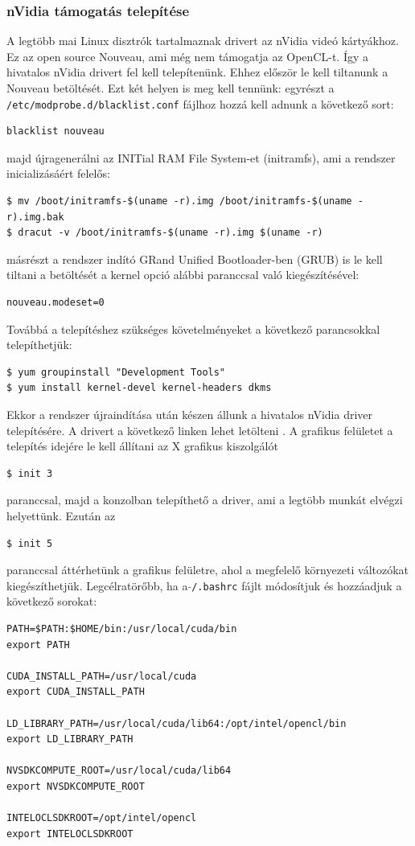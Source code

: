 \subsubsection{nVidia támogatás telepítése}
A legtöbb mai Linux disztrók tartalmaznak drivert az nVidia videó kártyákhoz.
Ez az open source Nouveau, ami még nem támogatja az OpenCL-t.
Így a hivatalos nVidia drivert fel kell telepítenünk.
Ehhez először le kell tiltanunk a Nouveau betöltését.
Ezt két helyen is meg kell tennünk: 
egyrészt a \texttt{/etc/modprobe.d/blacklist.conf} fájlhoz hozzá kell adnunk a
következő sort:
\begin{lstlisting}
blacklist nouveau
\end{lstlisting}
majd újragenerálni az INITial RAM File System-et (initramfs), ami a rendszer
inicializásáért felelős:
\begin{lstlisting}
$ mv /boot/initramfs-$(uname -r).img /boot/initramfs-$(uname -r).img.bak
$ dracut -v /boot/initramfs-$(uname -r).img $(uname -r)
\end{lstlisting}
másrészt a rendszer indító GRand Unified Bootloader-ben (GRUB) is le kell
tiltani a betöltését a kernel opció alábbi paranccsal való kiegészítésével:
\begin{lstlisting}
nouveau.modeset=0
\end{lstlisting}
Továbbá a telepítéshez szükséges követelményeket a következő parancsokkal telepíthetjük:
\begin{lstlisting}
$ yum groupinstall "Development Tools"
$ yum install kernel-devel kernel-headers dkms
\end{lstlisting}
Ekkor a rendszer újraindítása után készen állunk a hivatalos nVidia driver
telepítésére. A drivert a következő linken lehet letölteni \cite{nvidia-driver}.
A grafikus felületet a telepítés idejére le kell állítani az X grafikus
kiszolgálót
\begin{lstlisting}
$ init 3
\end{lstlisting}
paranccsal, majd a konzolban telepíthető a driver, ami a legtöbb munkát elvégzi helyettünk. Ezután az
\begin{lstlisting}
$ init 5
\end{lstlisting}
paranccsal áttérhetünk a grafikus felületre, ahol a megfelelő környezeti változókat kiegészíthetjük.
Legcélratörőbb, ha a \texttt{$\tilde{}$/.bashrc} fájlt módosítjuk és hozzáadjuk
a következő sorokat:
\begin{lstlisting}
PATH=$PATH:$HOME/bin:/usr/local/cuda/bin
export PATH

CUDA_INSTALL_PATH=/usr/local/cuda
export CUDA_INSTALL_PATH

LD_LIBRARY_PATH=/usr/local/cuda/lib64:/opt/intel/opencl/bin
export LD_LIBRARY_PATH

NVSDKCOMPUTE_ROOT=/usr/local/cuda/lib64
export NVSDKCOMPUTE_ROOT

INTELOCLSDKROOT=/opt/intel/opencl
export INTELOCLSDKROOT
\end{lstlisting}
